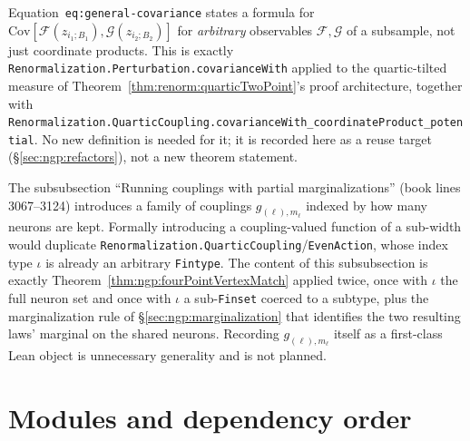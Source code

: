 \begin{remark}
Equation~\texttt{eq:general-covariance} states a formula for
$\mathrm{Cov}[\mathcal F(z_{i_1;B_1}),\mathcal G(z_{i_2;B_2})]$ for \emph{arbitrary} observables
$\mathcal F,\mathcal G$ of a subsample, not just coordinate products. This is exactly
\texttt{Renormalization.Perturbation.covarianceWith} applied to the quartic-tilted measure of
Theorem~\ref{thm:renorm:quarticTwoPoint}'s proof architecture, together with
\texttt{Renormalization.QuarticCoupling.covarianceWith\_coordinateProduct\_potential}. No new
definition is needed for it; it is recorded here as a reuse target
(\S\ref{sec:ngp:refactors}), not a new theorem statement.
\end{remark}

\begin{remark}
The subsubsection ``Running couplings with partial marginalizations'' (book lines 3067--3124)
introduces a family of couplings $g_{(\ell),m_\ell}$ indexed by how many neurons are kept. Formally
introducing a coupling-valued function of a sub-width would duplicate
\texttt{Renormalization.QuarticCoupling}/\texttt{EvenAction}, whose index type $\iota$ is already
an arbitrary \texttt{Fintype}. The content of this subsubsection is exactly
Theorem~\ref{thm:ngp:fourPointVertexMatch} applied twice, once with $\iota$ the full neuron set and
once with $\iota$ a sub-\texttt{Finset} coerced to a subtype, plus the marginalization rule of
\S\ref{sec:ngp:marginalization} that identifies the two resulting laws' marginal on the shared
neurons. Recording $g_{(\ell),m_\ell}$ itself as a first-class Lean object is unnecessary generality
and is not planned.
\end{remark}

\section{Modules and dependency order}
\label{sec:ngp:modules}

